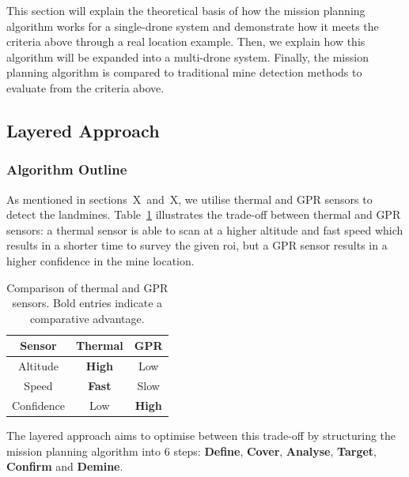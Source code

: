 This section will explain the theoretical basis of how the mission planning algorithm works for a single-drone system and demonstrate how it meets the criteria above through a real location example. Then, we explain how this algorithm will be expanded into a multi-drone system. Finally, the mission planning algorithm is compared to traditional mine detection methods to evaluate from the criteria above.  

\subsection{Layered Approach}
\label{sec:msp_layered_approach}

\subsubsection{Algorithm Outline}

As mentioned in sections~X~and~X, we utilise thermal and \gls{GPR} sensors to detect the landmines. Table~\ref{tab:thermal_vs_gpr} illustrates the trade-off between thermal and \gls{GPR} sensors: a thermal sensor is able to scan at a higher altitude and fast speed which results in a shorter time to survey the given \gls{roi}, but a \gls{GPR} sensor results in a higher confidence in the mine location. 

\begin{table}[h!]
    \centering
    \begin{tabular}{| c || c | c |}
        \hline
        Sensor & Thermal & \gls{GPR} \\
        \hline\hline
        Altitude & \textbf{High} & Low \\
        \hline
        Speed & \textbf{Fast} & Slow \\
        \hline
        Confidence & Low & \textbf{High} \\
        \hline
    \end{tabular}
    \caption[Comparison of Thermal and GPR Sensors]
    {Comparison of thermal and \gls{GPR} sensors. Bold entries indicate a comparative advantage.}
    \label{tab:thermal_vs_gpr}
\end{table}

The layered approach aims to optimise between this trade-off by structuring the mission planning algorithm into 6 steps: \textbf{Define}, \textbf{Cover}, \textbf{Analyse}, \textbf{Target}, \textbf{Confirm} and \textbf{Demine}. 

